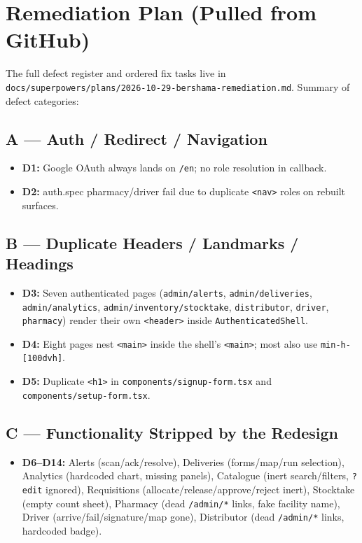 \documentclass[12pt, a4paper]{article}
\begin{document}
\section{Remediation Plan (Pulled from GitHub)}

The full defect register and ordered fix tasks live in \texttt{docs/superpowers/plans/2026-10-29-bershama-remediation.md}. Summary of defect categories:

\subsection{A --- Auth / Redirect / Navigation}
\begin{itemize}
    \item \textbf{D1:} Google OAuth always lands on \texttt{/en}; no role resolution in callback.
    \item \textbf{D2:} auth.spec pharmacy/driver fail due to duplicate \texttt{<nav>} roles on rebuilt surfaces.
\end{itemize}

\subsection{B --- Duplicate Headers / Landmarks / Headings}
\begin{itemize}
    \item \textbf{D3:} Seven authenticated pages (\texttt{admin/alerts}, \texttt{admin/deliveries}, \texttt{admin/analytics}, \texttt{admin/inventory/stocktake}, \texttt{distributor}, \texttt{driver}, \texttt{pharmacy}) render their own \texttt{<header>} inside \texttt{AuthenticatedShell}.
    \item \textbf{D4:} Eight pages nest \texttt{<main>} inside the shell's \texttt{<main>}; most also use \texttt{min-h-[100dvh]}.
    \item \textbf{D5:} Duplicate \texttt{<h1>} in \texttt{components/signup-form.tsx} and \texttt{components/setup-form.tsx}.
\end{itemize}

\subsection{C --- Functionality Stripped by the Redesign}
\begin{itemize}
    \item \textbf{D6--D14:} Alerts (scan/ack/resolve), Deliveries (forms/map/run selection), Analytics (hardcoded chart, missing panels), Catalogue (inert search/filters, \texttt{?edit} ignored), Requisitions (allocate/release/approve/reject inert), Stocktake (empty count sheet), Pharmacy (dead \texttt{/admin/*} links, fake facility name), Driver (arrive/fail/signature/map gone), Distributor (dead \texttt{/admin/*} links, hardcoded badge).
\end{itemize}
\end{document}
